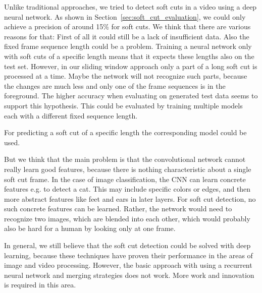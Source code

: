 Unlike traditional approaches, we tried to detect soft cuts in a video using a deep neural network.
As shown in Section~\ref{sec:soft_cut_evaluation}, we could only achieve a precision of around 15\% for soft cuts.
We think that there are various reasons for that:
First of all it could still be a lack of insufficient data.
Also the fixed frame sequence length could be a problem.
Training a neural network only with soft cuts of a specific length means that it expects these lengths also on the test set.
However, in our sliding window approach only a part of a long soft cut is processed at a time.
Maybe the network will not recognize such parts, because the changes are much less and only one of the frame sequences is in the foreground.
The higher accuracy when evaluating on generated test data seems to support this hypothesis.
This could be evaluated by training multiple models each with a different fixed sequence length.

For predicting a soft cut of a specific length the corresponding model could be used.

But we think that the main problem is that the convolutional network cannot really learn good features, because there is nothing characteristic about a single soft cut frame.
In the case of image classification, the CNN can learn concrete features e.g. to detect a cat.
This may include specific colors or edges, and then more abstract features like feet and ears in later layers.
For soft cut detection, no such concrete features can be learned.
Rather, the network would need to recognize two images, which are blended into each other, which would probably also be hard for a human by looking only at one frame.

In general, we still believe that the soft cut detection could be solved with deep learning, because these techniques have proven their performance in the areas of image and video processing.
However, the basic approach with using a recurrent neural network and merging strategies does not work.
More work and innovation is required in this area.
